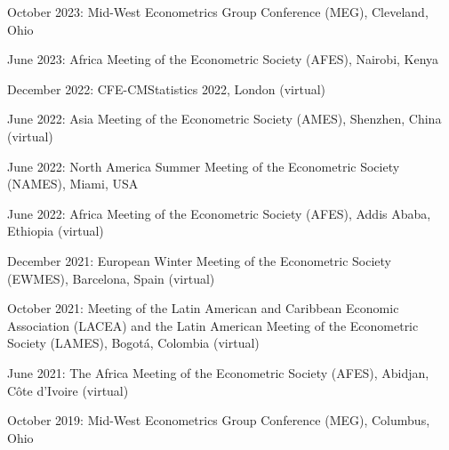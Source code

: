 \documentclass[12pt,letterpaper]{article}
\renewenvironment{itemize}{
  \begin{list}{}{
    \setlength{\leftmargin}{1.5em}
  }
}{
  \end{list}
}
\begin{document}
\begin{itemize}
  \item October 2023: Mid-West Econometrics Group Conference (MEG), Cleveland, Ohio
  \item June 2023: Africa Meeting of the Econometric Society (AFES), Nairobi, Kenya
  \item December 2022: CFE-CMStatistics 2022, London (virtual)
  \item June 2022: Asia Meeting of the Econometric Society (AMES), Shenzhen, China (virtual)
  \item June 2022: North America Summer Meeting of the Econometric Society (NAMES), Miami, USA
  \item June 2022: Africa Meeting of the Econometric Society (AFES), Addis Ababa, Ethiopia (virtual)
  \item December 2021: European Winter Meeting of the Econometric Society\\ (EWMES), Barcelona, Spain (virtual)
  \item October 2021: Meeting of the Latin American and Caribbean Economic Association (LACEA) and the Latin American Meeting of the Econometric Society (LAMES), Bogotá, Colombia (virtual)
	\item June 2021: The Africa Meeting of the Econometric Society (AFES), Abidjan, C\^ote d'Ivoire (virtual)
	\item October 2019: Mid-West Econometrics Group Conference (MEG), Columbus, Ohio
\end{itemize}
\end{document}
